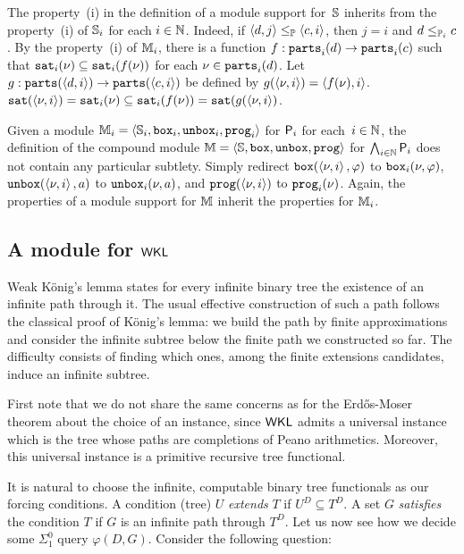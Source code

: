 The property~(i) in the definition of a module support for~$\mathbb{S}$ inherits from
the property~(i) of $\mathbb{S}_i$ for each $i \in \mathbb{N}$. Indeed, if $\left\langle d,j \right\rangle \leq_{\mathbb{P}} \left\langle c,i \right\rangle$,
then $j = i$ and $d \leq_{\mathbb{P}_i} c$. By the property~(i) of $\mathbb{M}_i$, there is a function
$f : \mathtt{parts}_i(d) \to \mathtt{parts}_i(c)$ such that $\mathtt{sat}_i(\nu) \subseteq \mathtt{sat}_i(f(\nu))$
for each $\nu \in \mathtt{parts}_i(d)$. Let $g : \mathtt{parts}(\left\langle d,i \right\rangle) \to \mathtt{parts}(\left\langle c,i \right\rangle)$
be defined by $g(\left\langle \nu,i \right\rangle) = \left\langle f(\nu), i \right\rangle$.
$\mathtt{sat}(\left\langle \nu,i \right\rangle) = \mathtt{sat}_i(\nu) \subseteq \mathtt{sat}_i(f(\nu)) = \mathtt{sat}(g(\left\langle \nu,i \right\rangle)$.

Given a module $\mathbb{M}_i = \left\langle \mathbb{S}_i, \mathtt{box}_i, \mathtt{unbox}_i, \mathtt{prog}_i \right\rangle$ for $\mathsf{P}_i$ for each~$i \in \mathbb{N}$,
the definition of the compound module $\mathbb{M} = \left\langle \mathbb{S}, \mathtt{box}, \mathtt{unbox}, \mathtt{prog} \right\rangle$ for $\bigwedge_{i \in \mathbb{N}} \mathsf{P}_i$
does not contain any particular subtlety.
Simply redirect $\mathtt{box}(\left\langle \nu,i \right\rangle, \varphi)$ to $\mathtt{box}_i(\nu, \varphi)$,
$\mathtt{unbox}(\left\langle \nu,i \right\rangle, a)$ to $\mathtt{unbox}_i(\nu, a)$, and $\mathtt{prog}(\left\langle \nu,i \right\rangle)$ to $\mathtt{prog}_i(\nu)$.
Again, the properties of a module support for $\mathbb{M}$ inherit the properties for $\mathbb{M}_i$.

\subsection{A module for $\operatorname{\sf{WKL}}$}\label{subsect:module-for-wkl}

Weak K\"onig's lemma states for every infinite binary tree
the existence of an infinite path through it.
The usual effective construction of such a path follows
the classical proof of K\"onig's lemma:
we build the path by finite approximations and consider 
the infinite subtree below the finite path we constructed so far.
The difficulty consists of finding which ones, among the finite extensions candidates,
induce an infinite subtree.

First note that we do not share the same concerns as for the Erd\H{o}s-Moser theorem
about the choice of an instance, since $\operatorname{\sf{WKL}}$ admits a universal instance which is the tree
whose paths are completions of Peano arithmetics. Moreover,
this universal instance is a primitive recursive tree functional.

It is natural to choose the infinite, computable binary tree functionals as our forcing conditions.
A condition (tree) $U$ \emph{extends} $T$ if $U^D \subseteq T^D$. 
A set $G$ \emph{satisfies} the condition $T$ if $G$ is an infinite path through $T^D$.
Let us now see how we decide some $\Sigma^0_1$ query $\varphi(D, G)$. Consider the following question:

